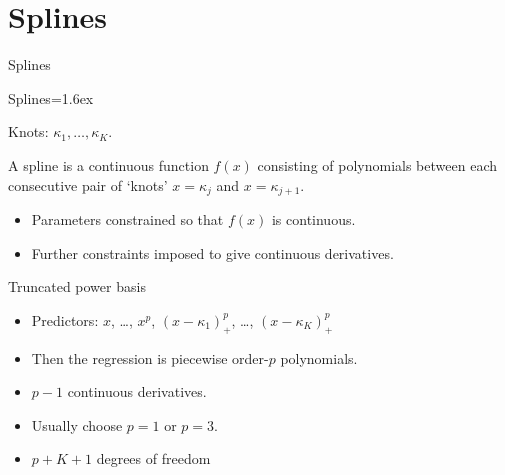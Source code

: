 \documentclass[14pt]{beamer}
\makeatletter
\def\biz{\begin{itemize}[<+-| alert@+>]}
\def\eiz{\end{itemize}}
\makeatother
\begin{document}
\section{Splines}




\begin{frame}{Splines}
\end{frame}
 
\begin{frame}{Splines}\parskip=1.6ex

Knots: $\kappa_1,\dots,\kappa_K$.

\pause

A spline is a continuous function $f(x)$ consisting of polynomials between each
consecutive pair of `knots' $x=\kappa_j$ and $x=\kappa_{j+1}$.

\pause

\begin{itemize}
\item Parameters constrained so that $f(x)$ is continuous.

\item Further constraints imposed to give continuous derivatives.
\end{itemize}
\end{frame}


\begin{frame}

\end{frame}

\begin{frame}{Truncated power basis}
\biz

\item Predictors: $x$, \dots, $x^p$, $(x-\kappa_{1})_+^p$, \dots, $(x-\kappa_{K})_+^p$\pause

\item Then the regression is piecewise order-$p$ polynomials.
\item $p-1$ continuous derivatives.
\item Usually choose $p=1$ or $p=3$.

\item $p+K+1$ degrees of freedom
\eiz
\end{frame}
\end{document}
